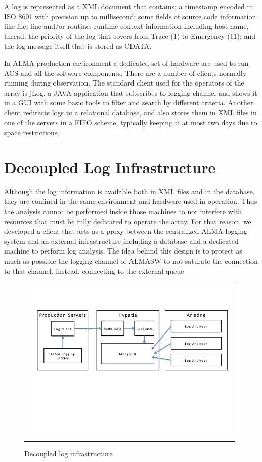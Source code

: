 \documentclass[]{spie}  %
\begin{document}
A log is represented as a XML document that contains: a timestamp encoded in
ISO 8601 with precision up to millisecond; some fields of source code
information like file, line and/or routine; runtime context information
including host name, thread; the priority of the log that covers from Trace (1)
to Emergency (11); and the log message itself that is stored as CDATA\cite{avarias2010introducing}.
 
In ALMA production environment a dedicated set of hardware are used to run ACS
and all the software components. There are a number of clients normally running
during observation. The standard client used for the operators of the array is
jLog, a JAVA application that subscribes to logging channel and shows it in a
GUI with some basic tools to filter and search by different criteria. Another
client redirects logs to a relational database, and also stores them in XML
files in one of the servers in a FIFO scheme, typically keeping it at most two
days due to space restrictions\cite{shen2012alma}.

\section{Decoupled Log Infrastructure}
Although the log information is available both in XML files and in the
database, they are confined in the same environment and hardware used in
operation. Thus the analysis cannot be performed inside those machines to not
interfere with resources that must be fully dedicated to operate the array. For
that reason, we developed a client that acts as a proxy between the centralized
ALMA logging system and an external infrastructure including a database and a
dedicated machine to perform log analysis. The idea behind this design is to
protect as much as possible the logging channel of ALMASW to not saturate the
connection to that channel, instead, connecting to the external queue

   \begin{figure}[!ht]
   \begin{center}
   \begin{tabular}{c}
   \includegraphics[height=8.0cm]{../img/image1-decoupled.png}
   \end{tabular}
   \end{center}
   \caption[dc] 
   { \label{fig:dc} Decoupled log infrastructure}
   \end{figure} 
\end{document}
